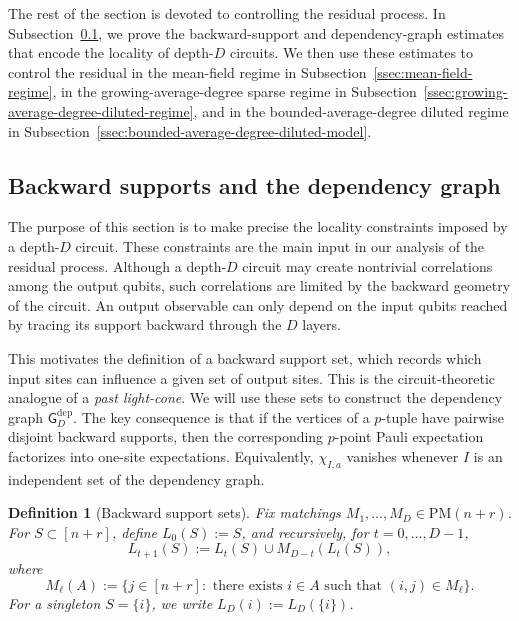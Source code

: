 \documentclass[12pt]{article}
\newtheorem{definition}{Definition}[section]
\begin{document}
The rest of the section is devoted to controlling the residual process. In Subsection~\ref{ssec:backwardsupports}, we prove the backward-support and dependency-graph estimates that encode the locality of depth-\(D\) circuits. We then use these estimates to control the residual in the mean-field regime in Subsection~\ref{ssec:mean-field-regime}, in the growing-average-degree sparse regime in Subsection~\ref{ssec:growing-average-degree-diluted-regime}, and in the bounded-average-degree diluted regime in Subsection~\ref{ssec:bounded-average-degree-diluted-model}.

\subsection{Backward supports and the dependency graph} \label{ssec:backwardsupports}
The purpose of this section is to make precise the locality constraints imposed
by a depth-$D$ circuit. These constraints are the main input in our analysis
of the residual process. Although a depth-\(D\) circuit may create nontrivial
correlations among the output qubits, such correlations are limited by the
backward geometry of the circuit. An output observable can only depend on the
input qubits reached by tracing its support backward through the \(D\) layers.

This motivates the definition of a backward support set, which records which
input sites can influence a given set of output sites. This is the
circuit-theoretic analogue of a \textit{past light-cone}. We will use
these sets to construct the dependency graph \(\mathsf G_D^{\mathrm{dep}}\).
The key consequence is that if the vertices of a $p$-tuple have pairwise
disjoint backward supports, then the corresponding $p$-point Pauli
expectation factorizes into one-site expectations. Equivalently, \(\chi_{I,a}\) vanishes whenever $I$ is an independent set of the dependency graph. 





\begin{definition}[Backward support sets]
\label{def:backward-support}
Fix matchings \(M_1,\dots,M_D \in \mathrm{PM}(n+r)\). For \(S\subset[n+r]\), define $L_0(S):=S$, and recursively, for \(t=0,\dots,D-1\),
\[
L_{t+1}(S)
:=
L_t(S)\cup M_{D-t}(L_t(S)),
\]
where
\[
M_\ell(A):=\{j\in[n+r]: \text{ there exists }i\in A
\text{ such that }(i,j)\in M_\ell\}.
\]
For a singleton \(S=\{i\}\), we write \(L_D(i):=L_D(\{i\})\).
\end{definition}
\end{document}
